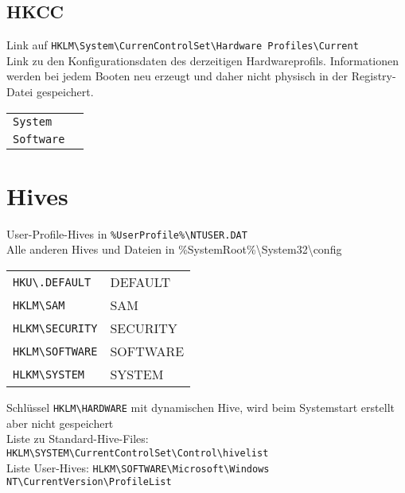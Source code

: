 \subsection{HKCC}
Link auf \texttt{HKLM\textbackslash System\textbackslash CurrenControlSet\textbackslash Hardware Profiles\textbackslash Current}\\
Link zu den Konfigurationsdaten des derzeitigen Hardwareprofils. Informationen werden bei jedem Booten neu erzeugt und daher nicht physisch in der Registry-Datei gespeichert.
\settowidth{\MyLen}{HLKM.folder.}
\begin{tabular}{@{}p{\the\MyLen}%
		@{}p{\linewidth-\the\MyLen}@{}}
	\texttt{System} & \\
	\texttt{Software} & \\
\end{tabular}

\section{Hives}
User-Profile-Hives in \texttt{\%UserProfile\%\textbackslash NTUSER.DAT}\\
Alle anderen Hives und Dateien in \%SystemRoot\%\textbackslash System32\textbackslash config
\begin{tabular}{@{}p{\the\MyLen}%
		@{}p{\linewidth-\the\MyLen}@{}}
	\texttt{HKU\textbackslash .DEFAULT} & DEFAULT\\
	\texttt{HKLM\textbackslash SAM} & SAM\\
	\texttt{HLKM\textbackslash SECURITY} & SECURITY\\
	\texttt{HKLM\textbackslash SOFTWARE} & SOFTWARE\\
	\texttt{HLKM\textbackslash SYSTEM} & SYSTEM\\
\end{tabular}
Schlüssel \texttt{HKLM\textbackslash HARDWARE} mit dynamischen Hive, wird beim Systemstart erstellt aber nicht gespeichert\\
Liste zu Standard-Hive-Files: \texttt{HKLM\textbackslash SYSTEM\textbackslash CurrentControlSet\textbackslash Control\textbackslash hivelist}\\
Liste User-Hives: \texttt{HLKM\textbackslash SOFTWARE\textbackslash Microsoft\textbackslash Windows NT\textbackslash CurrentVersion\textbackslash ProfileList}

